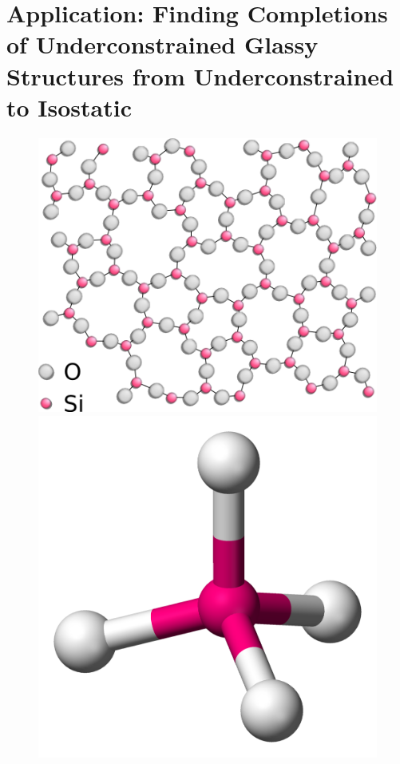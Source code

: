 \section{Application: Finding Completions of Underconstrained Glassy Structures from Underconstrained to Isostatic}
\label{sec:bodypin}

% 



\ClearMyMinHeight
{}

\begin{figure}\centering
    \includegraphics[height=\myMinHeight]{img/Silica}
    \hspace{0.5cm}
    \includegraphics[height=\myMinHeight]{img/Silicon_tetrahedron}

\end{figure}
